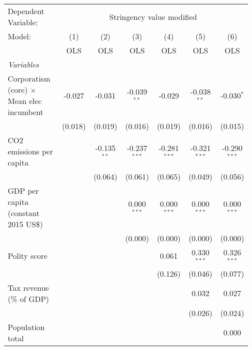 
\begingroup
\centering
\begin{tabular}{lcccccc}
   \toprule
   Dependent Variable: & \multicolumn{6}{c}{Stringency value modified}\\
   Model:                                           & (1)     & (2)           & (3)            & (4)            & (5)            & (6)\\  
                                                    &  OLS    & OLS           & OLS            & OLS            & OLS            & OLS\\  
   \midrule
   \emph{Variables}\\
   Corporatism (core) $\times$ Mean elec incumbent  & -0.027  & -0.031        & -0.039$^{**}$  & -0.029         & -0.038$^{**}$  & -0.030$^{*}$\\   
                                                    & (0.018) & (0.019)       & (0.016)        & (0.019)        & (0.016)        & (0.015)\\   
   CO2 emissions per capita                         &         & -0.135$^{**}$ & -0.237$^{***}$ & -0.281$^{***}$ & -0.321$^{***}$ & -0.290$^{***}$\\   
                                                    &         & (0.064)       & (0.061)        & (0.065)        & (0.049)        & (0.056)\\   
   GDP per capita (constant 2015 US\$)              &         &               & 0.000$^{***}$  & 0.000$^{***}$  & 0.000$^{***}$  & 0.000$^{***}$\\   
                                                    &         &               & (0.000)        & (0.000)        & (0.000)        & (0.000)\\   
   Polity score                                     &         &               &                & 0.061          & 0.330$^{***}$  & 0.326$^{***}$\\   
                                                    &         &               &                & (0.126)        & (0.046)        & (0.077)\\   
   Tax revenue (\% of GDP)                          &         &               &                &                & 0.032          & 0.027\\   
                                                    &         &               &                &                & (0.026)        & (0.024)\\   
   Population total                                 &         &               &                &                &                & 0.000\\   

\end{tabular}
